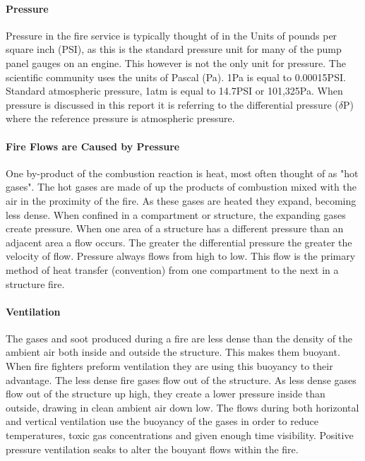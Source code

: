 \documentclass{article}
\begin{document}
\paragraph{Pressure} \mbox{}

Pressure in the fire service is typically thought of in the Units of pounds per square inch (PSI), as this is the standard pressure unit for many of the pump panel gauges on an engine. This however is not the only unit for pressure. The scientific community uses the units of Pascal (Pa).  1Pa is equal to 0.00015PSI. Standard atmospheric pressure, 1atm  is equal to 14.7PSI or 101,325Pa. When pressure is discussed in this report it is referring to the differential pressure ($\delta$P) where the reference pressure is atmospheric pressure. 

\paragraph{Fire Flows are Caused by Pressure} \mbox{}

One by-product of the combustion reaction is heat, most often thought of as "hot gases". The hot gases are made of up the products of combustion mixed with the air in the proximity of the fire. As these gases are heated they expand, becoming less dense. When confined in a compartment or structure, the expanding gases create pressure. When one area of a structure has a different pressure than an adjacent area a flow occurs. The greater the differential pressure the greater the velocity of flow. Pressure always flows from high to low. This flow is the primary method of heat transfer (convention) from one compartment to the next in a structure fire. 

\paragraph{Ventilation} \mbox{}

The gases and soot produced during a fire are less dense than the density of the ambient air both inside and outside the structure. This makes them buoyant. When fire fighters preform ventilation they are using this buoyancy to their advantage. The less dense fire gases flow out of the structure. As less dense gases flow out of the structure up high, they create a lower pressure inside than outside, drawing in clean ambient air down low. The flows during both horizontal and vertical ventilation use the buoyancy of the gases in order to reduce temperatures, toxic gas concentrations and given enough time visibility. Positive pressure ventilation seaks to alter the bouyant flows within the fire. 
\end{document}
